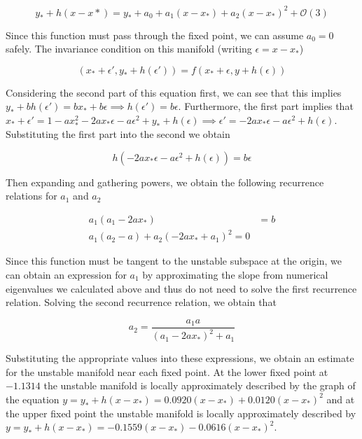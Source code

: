 \documentclass{article}
\begin{document}
\begin{equation*}
	y_* + h(x-x*) = y_* + a_0 + a_1(x-x_*) + a_2(x-x_*)^2 + \mathcal{O}(3)
\end{equation*}

Since this function must pass through the fixed point, we can assume $a_0 = 0$ safely. The invariance condition on this manifold (writing $\epsilon = x - x_*$)

\begin{equation*}
	(x_* + \epsilon',y_* + h(\epsilon')) = f(x_* + \epsilon, y + h(\epsilon))
\end{equation*}

Considering the second part of this equation first, we can see that this implies $y_* + bh(\epsilon') = bx_* + b\epsilon \implies h(\epsilon') = b\epsilon$. 
Furthermore, the first part implies that $x_* + \epsilon' = 1 - ax_*^2 - 2ax_*\epsilon - a\epsilon^2 + y_* + h(\epsilon) \implies \epsilon' = -2ax_*\epsilon - a\epsilon^2 + h(\epsilon)$. 
Substituting the first part into the second we obtain 

\begin{equation*}
	h(-2ax_*\epsilon - a\epsilon^2 + h(\epsilon)) = b\epsilon
\end{equation*}

Then expanding and gathering powers, we obtain the following recurrence relations for $a_1$ and $a_2$

\begin{align*}
	a_1(a_1 - 2ax_*) &= b \\
	a_1(a_2-a) + a_2(-2ax_* + a_1)^2 = 0
\end{align*}

Since this function must be tangent to the unstable subspace at the origin, we can obtain an 
expression for $a_1$ by approximating the slope from numerical eigenvalues we calculated above and thus do not need to solve 
the first recurrence relation. Solving the second recurrence relation, we obtain that 

\begin{equation*}
	a_2 = \frac{a_1a}{(a_1 - 2ax_*)^2 + a_1}
\end{equation*}

Substituting the appropriate values into these expressions, we obtain an estimate for the 
unstable manifold near each fixed point. At the lower fixed point at $-1.1314$ the unstable 
manifold is locally approximately described by the graph of the equation $y = y_* + h(x-x_*) =  0.0920(x-x_*) + 0.0120(x-x_*)^2$ 
and at the upper fixed point the unstable manifold is locally approximately described by 
$y = y_* + h(x-x_*) = -0.1559(x-x_*) - 0.0616(x-x_*)^2$.
\end{document}
